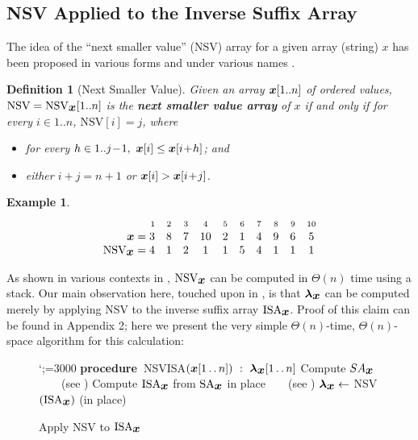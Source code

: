 \documentclass[10pt]{llncs}
\newtheorem{defn}[thrm]{Definition}
\newtheorem{examp}[thrm]{Example}
\def\dd{\mathinner{\ldotp\ldotp}}
\def\s#1{\mbox{\boldmath $#1$}}
\def\+{\!+\!}
\def\-{\!-\!}
\def\itbf#1{\textit{\textbf{#1}}}
\def\bproc{{\bf procedure\ }}
\def\la{\leftarrow}
\def\SA{\mbox{SA}}
\def\ISA{\mbox{ISA}}
\def\NSV{\mbox{NSV}}
\begin{document}
\subsection{NSV Applied to the Inverse Suffix Array}
\label{subsect-nsvisa}
The idea of the ``next smaller value'' (NSV) array for a given array (string) \s{x}
has been proposed in various forms and under various names
\cite{AGKR02,FMN08,OG11,GB13}.
\begin{defn}[Next Smaller Value]
Given an array $\s{x}[1..n]$ of ordered values,
$\NSV = \NSV_{\s{x}}[1..n]$ is the \itbf{next smaller value array} of \s{x}
if and only if for every $i \in 1..n$, $\NSV[i] = j$, where
\begin{itemize}
\item[$(a)$]
for every $h \in 1..j\- 1,\ \s{x}[i] \le \s{x}[i\+ h]$; and
\item[$(b)$]
either $i\+ j = n\+ 1$ or $\s{x}[i] > \s{x}[i\+ j]$.
\end{itemize}
\end{defn}
\begin{examp}
\begin{equation*}
\label{ex1}
\begin{array}{rccccccccc}
\scriptstyle 1 & \scriptstyle 2 & \scriptstyle 3 & \scriptstyle 4 & \scriptstyle 5 & \scriptstyle 6 & \scriptstyle 7 & \scriptstyle 8 & \scriptstyle 9 & \scriptstyle 10 \\ 
\s{x} = 3 & 8 & 7 & 10 & 2 & 1 & 4 & 9 & 6 & 5 \\ 
\NSV_{\s{x}} = 4 & 1 & 2 & 1 & 1 & 5 & 4 & 1 & 1 & 1
\end{array}
\end{equation*}
\end{examp}
As shown in various contexts in \cite{GB13},
$\NSV_{\s{x}}$ can be computed in $\Theta(n)$ time using a stack.
Our main observation here, touched upon in \cite{HR03},
is that $\s{\lambda}_{\s{x}}$ can be computed merely by applying NSV
to the inverse suffix array $\ISA_{\s{x}}$.
Proof of this claim can be found in Appendix 2;
here we present the very simple $\Theta(n)$-time, $\Theta(n)$-space algorithm for this calculation:
\begin{figure}[ht]


{\leftskip=3.4cm\obeylines\sfcode`;=3000
\bproc NSVISA$(\s{x}[1\dd n])\ :\ \s{\lambda}_{\s{x}}[1\dd n]$
Compute $SA_{\s{x}}$\ \ \ \ (see \cite{NZC09,PST07})
Compute $\ISA_{\s{x}}$ from $\SA_{\s{x}}$ in place\ \ \ \ (see \cite{PST07})
$\s{\lambda}_{\s{x}} \la$ NSV$(\ISA_{\s{x}})$ (in place)
}
\caption{Apply NSV to $\ISA_{\s{x}}$}
\label{fig-3line}
\end{figure}
\end{document}
